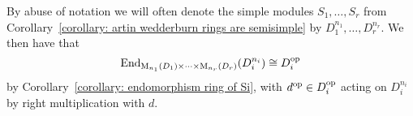 \begin{notation}
  \label{notation: simple modules over products of matrix rings}
  By abuse of notation we will often denote the simple modules $S_1, \dotsc, S_r$ from Corollary~\ref{corollary: artin wedderburn rings are semisimple} by $D_1^{n_1}, \dotsc, D_r^{n_r}$.
  We then have that
  \[
          \operatorname{End}_{\operatorname{M}_{n_1}(D_1) \times \dotsb \times \operatorname{M}_{n_r}(D_r)}(D_i^{n_i})
    \cong D_i^{\operatorname{op}}
  \]
  by Corollary~\ref{corollary: endomorphism ring of Si}, with $d^{\operatorname{op}} \in D_i^{\operatorname{op}}$ acting on $D_i^{n_i}$ by right multiplication with $d$.
\end{notation}




